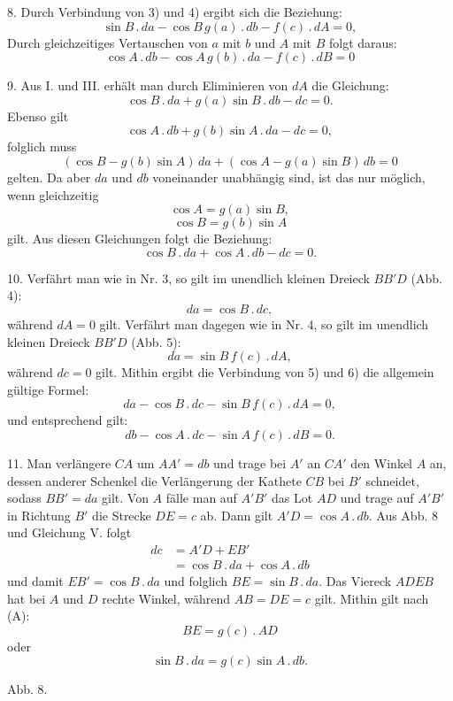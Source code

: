 %
8. Durch Verbindung von 3) und 4) ergibt sich die Beziehung:
\[
\tag*{III.} \sin B \,.\, da - \cos B\, g(a) \,.\, db - f(c) \,.\, dA = 0,
\]
Durch gleichzeitiges Vertauschen von $a$ mit $b$ und $A$ mit $B$
folgt daraus:
\[
\tag*{IV.} \cos A \,.\, db - \cos A\, g(b) \,.\, da - f(c) \,.\, dB = 0
\]

9. Aus I. und III. erhält man durch Eliminieren von $dA$ die Gleichung:
\[
\cos B \,.\, da + g(a) \sin B \,.\, db - dc = 0.
\]
Ebenso gilt
\[
\cos A \,.\, db + g(b) \sin A \,.\, da - dc = 0,
\]
folglich muss
\[
(\cos B - g(b) \sin A)\, da + (\cos A - g(a) \sin B)\, db = 0
\]
gelten. Da aber $da$ und $db$ voneinander unabhängig sind, ist das nur möglich,
wenn gleichzeitig
\[
\tag*{V. 1)} \cos A = g(a) \sin B,
\]
\[
\tag*{V. 2)} \cos B = g(b) \sin A
\]
gilt. Aus diesen Gleichungen folgt die Beziehung:
\[
\tag*{V.} \cos B \,.\, da + \cos A \,.\, db - dc = 0.
\]

10. Verfährt man wie in Nr. 3, so gilt im unendlich kleinen Dreieck $BB'D$
(Abb. 4):
\[
\tag*{5)} da = \cos B \,.\, dc,
\]
während $dA = 0$ gilt. Verfährt man dagegen wie in Nr. 4, so gilt im unendlich
kleinen Dreieck $BB'D$ (Abb. 5):
\[
\tag*{6)} da = \sin B\, f(c) \,.\, dA,
\]
während $dc = 0$ gilt. Mithin ergibt die Verbindung von 5) und 6) die allgemein
gültige Formel:
\[
\tag*{VI.} da - \cos B \,.\, dc - \sin B\, f(c) \,.\, dA = 0,
\]
und entsprechend gilt:
\[
\tag*{VII.} db - \cos A \,.\, dc - \sin A\, f(c) \,.\, dB = 0.
\]

11. Man verlängere $CA$ um $AA' = db$ und trage bei $A'$ an $CA'$ den Winkel
$A$ an, dessen anderer Schenkel die Verlängerung der Kathete $CB$ bei
$B'$ schneidet, sodass $BB' = da$ gilt. Von $A$ fälle man auf $A'B'$ das Lot
$AD$ und trage auf $A'B'$ in Richtung $B'$ die Strecke $DE = c$ ab. Dann gilt
$A'D = \cos A \,.\, db$. Aus Abb. 8 und Gleichung V. folgt
\[
\begin{aligned}dc &= A'D + EB'\\ &= \cos B \,.\, da + \cos A \,.\, db\end{aligned}
\]
und damit $EB' = \cos B \,.\, da$ und folglich $BE = \sin B \,.\, da$. Das Viereck $ADEB$ hat bei
$A$ und $D$ rechte Winkel, während $AB = DE = c$ gilt. Mithin gilt nach (A):
\[
BE = g(c) \,.\, AD
\]
oder
\[
\sin B \,.\, da = g(c) \sin A \,.\, db.
\]

\begin{center}\begin{minipage}{\linewidth}\centering


Abb. 8.
\end{minipage}\end{center}
